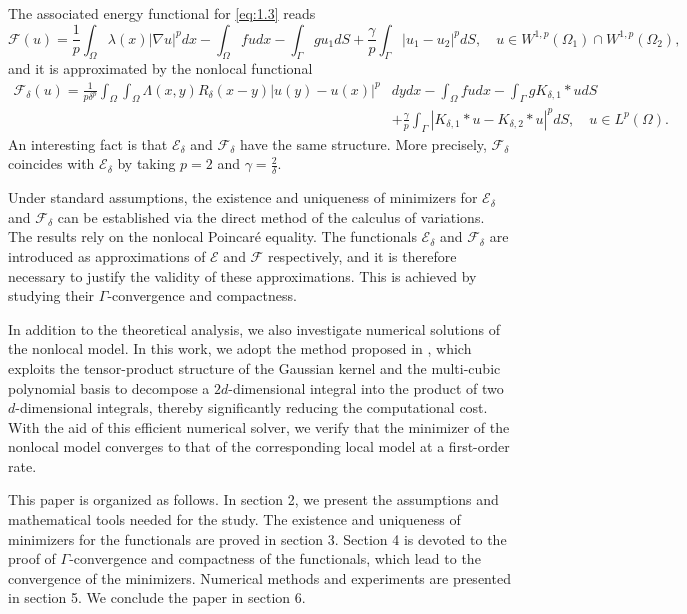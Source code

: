 \documentclass{article}
\theoremstyle{definition}
\begin{document}
The associated energy functional for \eqref{eq:1.3} reads
\[
\mathcal{F}(u)
=\frac{1}{p}\int_{\Omega}\lambda(x)|\nabla u|^pdx
 -\int_\Omega fudx
 -\int_\Gamma gu_1dS
 +\frac{\gamma}{p}\int_\Gamma |u_1-u_2|^pdS,\quad u\in W^{1,p}(\Omega_1)\cap W^{1,p}(\Omega_2),
\]
and it is approximated by the nonlocal functional
\begin{align*}
  \mathcal{F}_\delta(u)=
    \frac{1}{p\delta^p}\int_{\Omega}\int_{\Omega}\Lambda(x,y)R_\delta(x-y)|u(y)-u(x)|^p&dydx
-\int_{\Omega}fudx
-\int_\Gamma g K_{\delta,1}\ast u dS \\
&+
\frac{\gamma}{p}\int_\Gamma\left|K_{\delta,1}\ast u-K_{\delta,2}\ast u\right|^pdS,\quad u\in L^p(\Omega).
\end{align*}
An interesting fact is that $\mathcal{E}_\delta$ and $\mathcal{F}_\delta$ have the same structure.
More precisely, $\mathcal{F}_\delta$ coincides with $\mathcal{E}_\delta$ by taking $p=2$ and $\gamma=\frac{2}{\delta}$.


Under standard assumptions, the existence and uniqueness of minimizers for $\mathcal{E}_\delta$ and $\mathcal{F}_\delta$ can be established via the direct method of the calculus of variations.
The results rely on the nonlocal Poincar\'{e} equality.
The functionals $\mathcal{E}_\delta$ and $\mathcal{F}_\delta$ are introduced as approximations of $\mathcal{E}$ and $\mathcal{F}$ respectively, and it is therefore necessary to justify the validity of these approximations. This is achieved by studying their $\Gamma$-convergence and compactness.

In addition to the theoretical analysis, we also investigate numerical solutions of the nonlocal model. In this work, we adopt the method proposed in \cite{gan2025nonlocal}, which exploits the tensor-product structure of the Gaussian kernel and the multi-cubic polynomial basis to decompose a $2d$-dimensional integral into the product of two $d$-dimensional integrals, thereby significantly reducing the computational cost. With the aid of this efficient numerical solver, we verify that the minimizer of the nonlocal model converges to that of the corresponding local model at a first-order rate.

This paper is organized as follows. In section 2, we present the assumptions and mathematical tools needed for the study.
The existence and uniqueness of minimizers for the functionals are proved in section 3. Section 4 is devoted to the proof of $\Gamma$-convergence and compactness of the functionals, which lead to the convergence of the minimizers. Numerical methods and experiments are presented in section 5. We conclude the paper in section 6.
\end{document}
